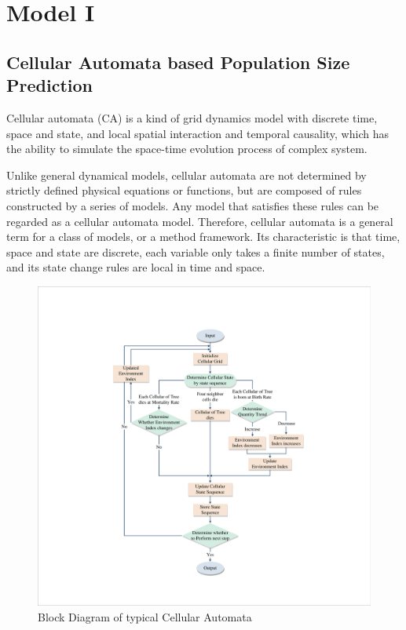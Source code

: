 \documentclass{mcmthesis}
\numberwithin{figure}{section}
\numberwithin{table}{section}
\numberwithin{equation}{section}
\begin{document}
\newpage

\section{Model I}
\subsection{Cellular Automata based Population Size Prediction}

Cellular automata (CA) is a kind of grid dynamics model with discrete time, 
space and state, and local spatial interaction and temporal causality, which 
has the ability to simulate the space-time evolution process of complex system.
\par
Unlike general dynamical models, cellular automata are not determined by strictly 
defined physical equations or functions, but are composed of rules constructed by 
a series of models. Any model that satisfies these rules can be regarded as a cellular 
automata model. Therefore, cellular automata is a general term for a class of models, 
or a method framework. Its characteristic is that time, space and state are discrete, 
each variable only takes a finite number of states, and its state change rules are local 
in time and space.
\begin{figure}[htbp]
  \centering
  \includegraphics[width = 12cm]{code&pic/元胞自动机流程图.pdf}
  \caption{Block Diagram of typical Cellular Automata}\label{CA_Fig}
\end{figure}
\end{document}
